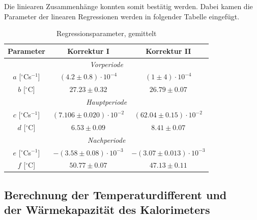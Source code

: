 \documentclass[bibliography=totocnumbered]{scrartcl}
\begin{document}
	Die liniearen Zusammenhänge konnten somit bestätig werden.
	Dabei kamen die Parameter der linearen Regressionen werden in folgender Tabelle eingefügt.
	\begin{table}[ht!]
		\centering
		\caption[Regressionsparameter]{Regressionsparameter, gemittelt}
		\begin{tabular}{|c||c|c|}
			\hline
			\textbf{Parameter} & \textbf{Korrektur I} & \textbf{Korrektur II }\\
			\hline\hline
			\multicolumn{3}{|c|}{\textit{Vorperiode}} \\
			\hline\hline
			$ a $ [$ ^{\circ} $Cs$ ^{-1} $] & $ (4.2\pm 0.8)\cdot 10^{-4}$  &$(1 \pm 4)\cdot 10^{-4}$  \\
			\hline
			$ b $ [$ ^{\circ} $C] & $ 27.23\pm0.32 $ &$ 26.79\pm 0.07$  \\
			\hline\hline
			\multicolumn{3}{|c|}{\textit{Hauptperiode}} \\
			\hline\hline
			$ c $ [$ ^{\circ} $Cs$ ^{-1} $]& $(7.106\pm0.020)\cdot 10^{-2}  $ & $(62.04\pm 0.15)\cdot 10^{-2} $ \\
			\hline
			$ d $  [$ ^{\circ} $C]& $6.53 \pm 0.09$ &$ 8.41\pm0.07 $  \\
			\hline\hline
			\multicolumn{3}{|c|}{\textit{Nachperiode}} \\
			\hline\hline
			$ e $ [$ ^{\circ} $Cs$ ^{-1} $] & $-(3.58 \pm0.08 )\cdot 10^{-3}$ & $ -(3.07\pm 0.013)\cdot 10^{-3}$ \\
			\hline
			$ f $  [$ ^{\circ} $C]& $50.77 \pm0.07 $ & $ 47.13\pm 0.11$ \\
			\hline
		\end{tabular}
		\label{tab: Parameter}
	\end{table}
	
	
	\subsection{Berechnung der Temperaturdifferent und \\ der Wärmekapazität des Kalorimeters}
	
\end{document}
